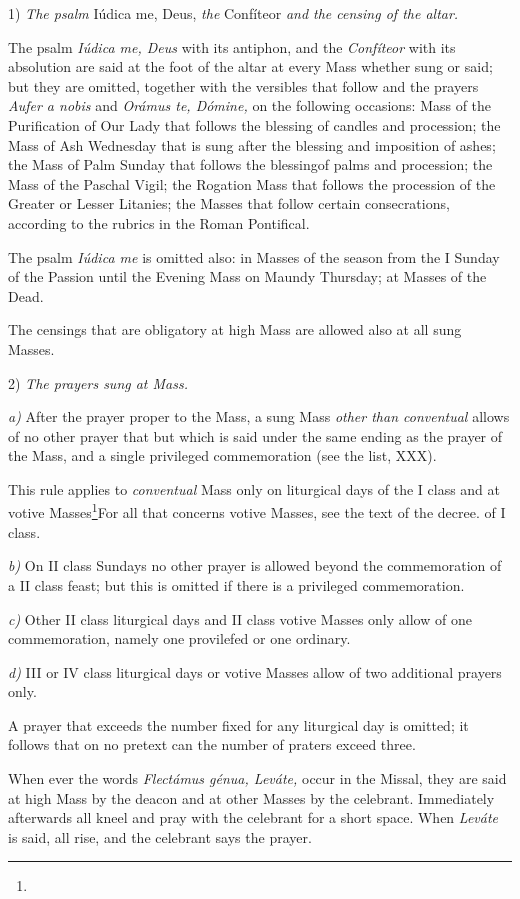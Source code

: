 1) {\it The psalm} Iúdica me, Deus, {\it the} Confíteor {\it and the censing of the altar.}

The psalm {\it Iúdica me, Deus} with its antiphon, and the {\it Confíteor} with its absolution are said at the foot of the altar at every Mass whether sung or said; but they are omitted, together with the versibles that follow and the prayers {\it Aufer a nobis} and {\it Orámus te, Dómine,} on the following occasions:
Mass of the Purification of Our Lady that follows the blessing of candles and procession;
the Mass of Ash Wednesday that is sung after the blessing and imposition of ashes;
the Mass of Palm Sunday that follows the blessingof palms and procession;
the Mass of the Paschal Vigil;
the Rogation Mass that follows the procession of the Greater or Lesser Litanies;
the Masses that follow certain consecrations, according to the rubrics in the Roman Pontifical.

The psalm {\it Iúdica me} is omitted also:
in Masses of the season from the I Sunday of the Passion until the Evening Mass on Maundy Thursday;
at Masses of the Dead.

The censings that are obligatory at high Mass are allowed also at all sung Masses.

2) {\it The prayers sung at Mass.}

{\it a)} After the prayer proper to the Mass, a sung Mass {\it other than conventual} allows of no other prayer that but which is said under the same ending as the prayer of the Mass, and a single privileged commemoration (see the list, XXX).

This rule applies to {\it conventual} Mass only on liturgical days of the I class and at votive Masses\footnote{}{For all that concerns votive Masses, see the text of the decree.} of I class.

{\it b)} On II class Sundays no other prayer is allowed beyond the commemoration of a II class feast; but this is omitted if there is a privileged commemoration.

{\it c)} Other II class liturgical days and II class votive Masses only allow of one commemoration, namely one provilefed or one ordinary.

{\it d)} III or IV class liturgical days or votive Masses allow of two additional prayers only.

A prayer that exceeds the number fixed for any liturgical day is omitted; it follows that on no pretext can the number of praters exceed three.

When ever the words {\it Flectámus génua, Leváte,} occur in the Missal, they are said at high Mass by the deacon and at other Masses by the celebrant. Immediately afterwards all kneel and pray with the celebrant for a short space. When {\it Leváte} is said, all rise, and the celebrant says the prayer.

